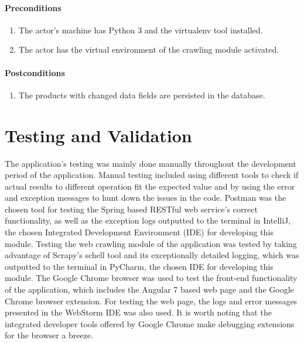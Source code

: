 \documentclass[12pt,a4paper,twoside]{report}
\begin{document}
\subsubsection{Preconditions}

\begin{enumerate}
  \item The actor's machine has Python 3 and the virtualenv tool installed.
  \item The actor has the virtual environment of the crawling module activated.
\end{enumerate}


\subsubsection{Postconditions}

\begin{enumerate}
  \item The products with changed data fields are persisted in the database.
\end{enumerate}







\chapter{Testing and Validation}

The application's testing was mainly done manually throughout the development period of the application. Manual testing included using different tools to check if actual results to different operation fit the expected value and by using the error and exception messages to hunt down the issues in the code. Postman was the chosen tool for testing the Spring based RESTful web service's correct functionality, as well as the exception logs outputted to the terminal in IntelliJ, the chosen Integrated Development Environment (IDE) for developing this module. Testing the web crawling module of the application was tested by taking advantage of Scrapy's schell tool and its exceptionally detailed logging, which was outputted to the terminal in PyCharm, the chosen IDE for developing this module. The Google Chrome browser was used to test the front-end functionality of the application, which includes the Angular 7 based web page and the Google Chrome browser extension. For testing the web page, the logs and error messages presented in the WebStorm IDE was also used. It is worth noting that the integrated developer tools offered by Google Chrome make debugging extensions for the browser a breeze.
\end{document}
